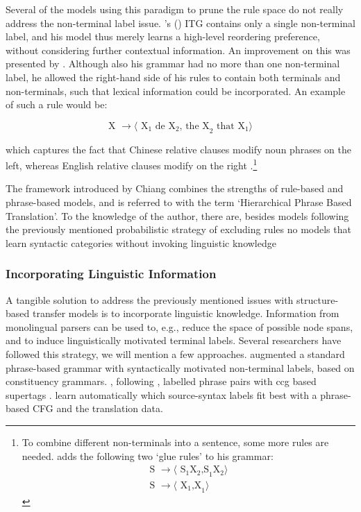 \documentclass{report}
\theoremstyle{break}
\def\citepos#1{\citeauthor{#1}'s (\citeyear{#1})}
\begin{document}
Several of the models using this paradigm to prune the rule space do not really address the non-terminal label issue. \citepos{wu1995algorithm} ITG contains only a single non-terminal label, and his model thus merely learns a high-level reordering preference, without considering further contextual information. An improvement on this was presented by \cite{chiang2005hierarchical,chiang2007hierarchical}. Although also his grammar had no more than one non-terminal label, he allowed the right-hand side of his rules to contain both terminals and non-terminals, such that lexical information could be incorporated. An example of such a rule would be:

\[
\text{X } \rightarrow \langle\text{ X}_1 \text{ de X}_2 \text{, the X}_2 \text{ that X}_1\rangle
\]

\noindent which captures the fact that Chinese relative clauses modify noun phrases on the left, whereas English relative clauses modify on the right \citep{chiang2007hierarchical}.\footnote{To combine different non-terminals into a sentence, some more rules are needed. \cite{chiang2007hierarchical} adds the following two `glue rules' to his grammar:\begin{align*}
 \text{S } \rightarrow \langle\text{ S}_1\text{X}_2 \text{,S}_1\text{X}_2\rangle\\
\text{S } \rightarrow \langle\text{ X}_1 \text{,X}_1\rangle 
\end{align*}

}

The framework introduced by Chiang combines the strengths of rule-based and phrase-based models, and is referred to with the term `Hierarchical Phrase Based Translation'. To the knowledge of the author, there are, besides models following the previously mentioned probabilistic strategy of excluding rules \citep[e.g.,]{mylonakis2010learning,blunsom2008bayesian} no models that learn syntactic categories without invoking linguistic knowledge


\subsubsection{Incorporating Linguistic Information}

A tangible solution to address the previously mentioned issues with structure-based transfer models is to incorporate linguistic knowledge. Information from monolingual parsers can be used to, e.g., reduce the space of possible node spans, and to induce linguistically motivated terminal labels. Several researchers have followed this strategy, we will mention a few approaches. \cite{zollmann2006syntax} augmented a standard phrase-based grammar with syntactically motivated non-terminal labels, based on constituency grammars. \cite{almaghout2010ccg}, following \cite{hassan2007supertagged}, labelled phrase pairs with ccg based supertags \citep{steedman2011combinatory}. \cite{mylonakis2011learning} learn automatically which source-syntax labels fit best with a phrase-based CFG and the translation data.
\end{document}

